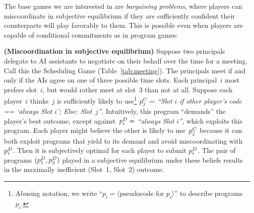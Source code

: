 \documentclass[sigconf]{aamas}
\theoremstyle{definition}
\begin{document}
The base games we are interested in are \textit{bargaining problems}, where players can miscoordinate in 
subjective equilibrium if they are sufficiently 
confident their counterparts will play favorably to them.
This is possible even when players are capable
of conditional commitments
as in program games:
\begin{exmp}
\label{ex:subjeq}
\textbf{(Miscoordination in subjective equilibrium)} 
Suppose
two principals delegate to AI assistants
to negotiate on their behalf
over the time for a meeting.
Call this the Scheduling Game
(Table~\ref{tab:meeting}).
The principals meet if and only if
the AIs agree on one of three possible time slots.
Each principal~$i$
most
prefers slot~$i$, 
but would rather meet at slot~3
than not at all.
Suppose each player~$i$
thinks~$j$
is sufficiently
likely to
use\footnote{Abusing notation, we write ``$p_i=\langle \text{pseudocode for } p_i 
\rangle$'' to describe programs $p_i$.}
$p_j^{C} = $ \textit{``Slot $i$ if other player's code == `always Slot $i$'; Else: Slot~$j$''}. 
Intuitively, this program ``demands'' the player's best outcome,
except against~$p_i^{D} =$ 
\textit{``always Slot $i$''}, which exploits this program.
Each player might believe the other is likely to use~$p_j^{C}$
because it can both exploit programs that yield to its demand
and avoid miscoordinating with~$p_i^{D}$.
Then it 
is subjectively optimal 
for each player to submit
$p_i^{D}$.
The pair of programs $(p_1^{D}, p_2^{D})$
played in a subjective equilibrium
under these beliefs
results in the maximally inefficient (Slot~1, Slot~2) outcome.
\end{exmp}
\end{document}
